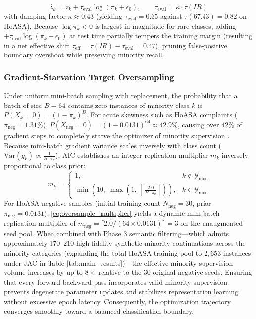 \documentclass{ieeeaccess}
\begin{document}
\begin{equation}
\label{eq:test_time_calibration}
    \hat{z}_k = z_k + \tau_{\text{eval}} \log(\pi_k + \epsilon_0), \qquad \tau_{\text{eval}} = \kappa \cdot \tau(IR)
\end{equation}
with damping factor $\kappa \approx 0.43$ (yielding $\tau_{\text{eval}} = 0.35$ against $\tau(67.43) = 0.82$ on HoASA). Because $\log \pi_k < 0$ is largest in magnitude for rare classes, adding $+\tau_{\text{eval}}\log(\pi_k + \epsilon_0)$ at test time partially tempers the training margin (resulting in a net effective shift $\tau_{\text{eff}} = \tau(IR) - \tau_{\text{eval}} = 0.47$), pruning false-positive boundary overshoot while preserving minority recall.

\subsubsection{Gradient-Starvation Target Oversampling}
Under uniform mini-batch sampling with replacement, the probability that a batch of size $B=64$ contains zero instances of minority class $k$ is $P(X_k = 0) = (1 - \pi_k)^B$. For acute skewness such as HoASA complaints ($\pi_{\text{neg}} = 1.31\%$), $P(X_{\text{neg}} = 0) = (1 - 0.0131)^{64} \approx 42.9\%$, causing over $42\%$ of gradient steps to completely starve the optimizer of minority supervision \cite{buda2018systematic}. Because mini-batch gradient variance scales inversely with class count ($\text{Var}(\bar{g}_k) \propto \frac{1}{B \cdot \pi_k}$), AIC establishes an integer replication multiplier $m_k$ inversely proportional to class prior:
\begin{equation}
\label{eq:oversample_multiplier}
    m_k = \begin{cases}
        1, & k \notin \mathcal{Y}_{\text{min}} \\
        \min\left(10, \; \max\left(1, \; \left\lceil \frac{2.0}{B \cdot \pi_k} \right\rceil\right)\right), & k \in \mathcal{Y}_{\text{min}}
    \end{cases}
\end{equation}
For HoASA negative samples (initial training count $N_{\text{neg}} = 30$, prior $\pi_{\text{neg}} = 0.0131$), \eqref{eq:oversample_multiplier} yields a dynamic mini-batch replication multiplier of $m_{\text{neg}} = \lceil 2.0 / (64 \times 0.0131) \rceil = 3$ on the unaugmented seed pool. When combined with Phase 3 semantic filtering---which admits approximately $170\text{--}210$ high-fidelity synthetic minority continuations across the minority categories (expanding the total HoASA training pool to $2{,}653$ instances under JAC in Table \ref{tab:main_results})---the effective minority supervision volume increases by up to $8\times$ relative to the $30$ original negative seeds. Ensuring that every forward-backward pass incorporates valid minority supervision prevents degenerate parameter updates and stabilizes representation learning without excessive epoch latency. Consequently, the optimization trajectory converges smoothly toward a balanced classification boundary.
\end{document}

